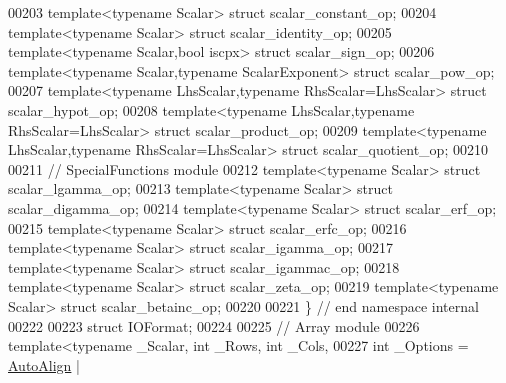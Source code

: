 \begin{DoxyCode}
00203 \textcolor{keyword}{template}<\textcolor{keyword}{typename} Scalar> \textcolor{keyword}{struct }scalar\_constant\_op;
00204 \textcolor{keyword}{template}<\textcolor{keyword}{typename} Scalar> \textcolor{keyword}{struct }scalar\_identity\_op;
00205 \textcolor{keyword}{template}<\textcolor{keyword}{typename} Scalar,\textcolor{keywordtype}{bool} iscpx> \textcolor{keyword}{struct }scalar\_sign\_op;
00206 \textcolor{keyword}{template}<\textcolor{keyword}{typename} Scalar,\textcolor{keyword}{typename} ScalarExponent> \textcolor{keyword}{struct }scalar\_pow\_op;
00207 \textcolor{keyword}{template}<\textcolor{keyword}{typename} LhsScalar,\textcolor{keyword}{typename} RhsScalar=LhsScalar> \textcolor{keyword}{struct }scalar\_hypot\_op;
00208 \textcolor{keyword}{template}<\textcolor{keyword}{typename} LhsScalar,\textcolor{keyword}{typename} RhsScalar=LhsScalar> \textcolor{keyword}{struct }scalar\_product\_op;
00209 \textcolor{keyword}{template}<\textcolor{keyword}{typename} LhsScalar,\textcolor{keyword}{typename} RhsScalar=LhsScalar> \textcolor{keyword}{struct }scalar\_quotient\_op;
00210 
00211 \textcolor{comment}{// SpecialFunctions module}
00212 \textcolor{keyword}{template}<\textcolor{keyword}{typename} Scalar> \textcolor{keyword}{struct }scalar\_lgamma\_op;
00213 \textcolor{keyword}{template}<\textcolor{keyword}{typename} Scalar> \textcolor{keyword}{struct }scalar\_digamma\_op;
00214 \textcolor{keyword}{template}<\textcolor{keyword}{typename} Scalar> \textcolor{keyword}{struct }scalar\_erf\_op;
00215 \textcolor{keyword}{template}<\textcolor{keyword}{typename} Scalar> \textcolor{keyword}{struct }scalar\_erfc\_op;
00216 \textcolor{keyword}{template}<\textcolor{keyword}{typename} Scalar> \textcolor{keyword}{struct }scalar\_igamma\_op;
00217 \textcolor{keyword}{template}<\textcolor{keyword}{typename} Scalar> \textcolor{keyword}{struct }scalar\_igammac\_op;
00218 \textcolor{keyword}{template}<\textcolor{keyword}{typename} Scalar> \textcolor{keyword}{struct }scalar\_zeta\_op;
00219 \textcolor{keyword}{template}<\textcolor{keyword}{typename} Scalar> \textcolor{keyword}{struct }scalar\_betainc\_op;
00220 
00221 \} \textcolor{comment}{// end namespace internal}
00222 
00223 \textcolor{keyword}{struct }IOFormat;
00224 
00225 \textcolor{comment}{// Array module}
00226 \textcolor{keyword}{template}<\textcolor{keyword}{typename} \_Scalar, \textcolor{keywordtype}{int} \_Rows, \textcolor{keywordtype}{int} \_Cols,
00227          \textcolor{keywordtype}{int} \_Options = \hyperlink{group__enums_ggaacded1a18ae58b0f554751f6cdf9eb13a28d63c0dd8560827162decfd898804f4}{AutoAlign} |

\end{DoxyCode}
